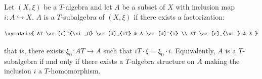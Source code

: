 Let $(X, \xi)$ be a $T$-algebra and let $A$ be a subset of $X$ with inclusion map $i: A \hookrightarrow X$. $A$ is a $T$-subalgebra of $(X, \xi)$ if there exists a factorization:

$$\xymatrix{
AT \ar[r]^{\xi_0} \ar[d]_{iT} & A \ar[d]^{i} \\
XT \ar[r]_{\xi} & X
}$$

that is, there exists $\xi_0: AT \longrightarrow A$ such that $iT \cdot \xi = \xi_0 \cdot i$. Equivalently, $A$ is a $T$-subalgebra if and only if there exists a $T$-algebra structure on $A$ making the inclusion $i$ a $T$-homomorphism.

